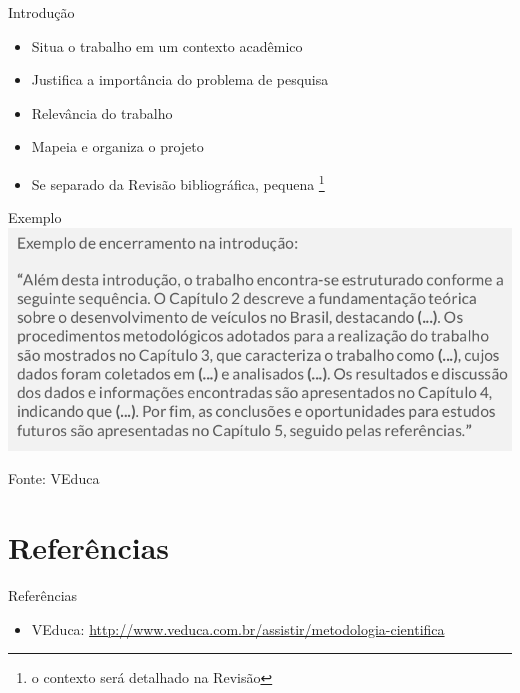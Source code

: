 \documentclass{beamer}
\begin{document}
\begin{frame}{Introdução}
  \begin{itemize}
  \item Situa o trabalho em um contexto acadêmico
  \item Justifica a importância do problema de pesquisa
  \item Relevância do trabalho
  \item Mapeia e organiza o projeto
  \item Se separado da Revisão bibliográfica, pequena \footnote{o
      contexto será detalhado na Revisão}
  \end{itemize}
\end{frame}

\begin{frame}{Exemplo}
  \includegraphics[width=\textwidth]{ProjetoI/exemplo-introducao}

  Fonte: VEduca
\end{frame}

\section{Referências}

\begin{frame}{Referências}
  \begin{itemize}
  \item VEduca: \url{http://www.veduca.com.br/assistir/metodologia-cientifica}
  \end{itemize}
\end{frame}
\end{document}
